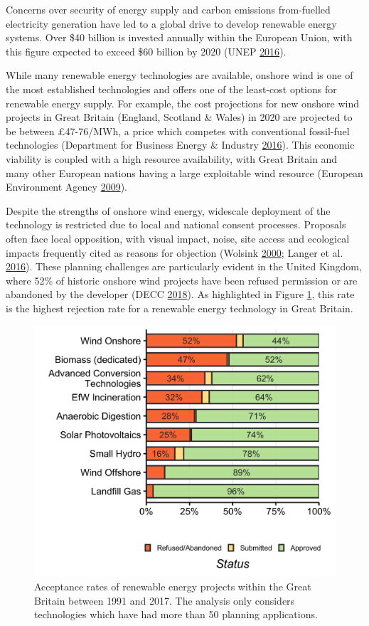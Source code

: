 \documentclass[a4paper,]{article}
\theoremstyle{definition}
\theoremstyle{definition}
\theoremstyle{definition}
\theoremstyle{remark}
\begin{document}
Concerns over security of energy supply and carbon emissions
from-fuelled electricity generation have led to a global drive to
develop renewable energy systems. Over \$40 billion is invested annually
within the European Union, with this figure expected to exceed \$60
billion by 2020 (UNEP \protect\hyperlink{ref-UNEP2016}{2016}).

While many renewable energy technologies are available, onshore wind is
one of the most established technologies and offers one of the
least-cost options for renewable energy supply. For example, the cost
projections for new onshore wind projects in Great Britain (England,
Scotland \& Wales) in 2020 are projected to be between £47-76/MWh, a
price which competes with conventional fossil-fuel technologies
(Department for Business Energy \& Industry
\protect\hyperlink{ref-DBIES2016}{2016}). This economic viability is
coupled with a high resource availability, with Great Britain and many
other European nations having a large exploitable wind resource
(European Environment Agency
\protect\hyperlink{ref-EuropeanEnvironmentAgency2009}{2009}).

Despite the strengths of onshore wind energy, widescale deployment of
the technology is restricted due to local and national consent
processes. Proposals often face local opposition, with visual impact,
noise, site access and ecological impacts frequently cited as reasons
for objection (Wolsink \protect\hyperlink{ref-Wolsink2000}{2000}; Langer
et al. \protect\hyperlink{ref-Langer2016}{2016}). These planning
challenges are particularly evident in the United Kingdom, where 52\% of
historic onshore wind projects have been refused permission or are
abandoned by the developer (DECC
\protect\hyperlink{ref-DECC2018}{2018}). As highlighted in Figure
\ref{fig:acceptanceRates}, this rate is the highest rejection rate for a
renewable energy technology in Great Britain.






\begin{figure}[h]

{\centering \includegraphics[width=0.5\linewidth]{figures/figure1} 

}

\caption{Acceptance rates of renewable energy projects
within the Great Britain between 1991 and 2017. The analysis only
considers technologies which have had more than 50 planning
applications.}\label{fig:acceptanceRates}
\end{figure}
\end{document}
